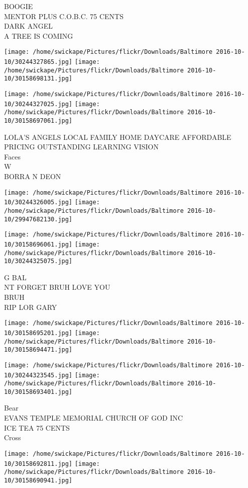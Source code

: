 \documentclass[10pt,letterpaper]{article}
\begin{document}
BOOGIE\\
MENTOR PLUS C.O.B.C. 75 CENTS\\
DARK ANGEL\\
A TREE IS COMING
\pagebreak

\texttt{[image: /home/swickape/Pictures/flickr/Downloads/Baltimore 2016-10-10/30244327865.jpg]}
\texttt{[image: /home/swickape/Pictures/flickr/Downloads/Baltimore 2016-10-10/30158698131.jpg]}

\texttt{[image: /home/swickape/Pictures/flickr/Downloads/Baltimore 2016-10-10/30244327025.jpg]}
\texttt{[image: /home/swickape/Pictures/flickr/Downloads/Baltimore 2016-10-10/30158697061.jpg]}

LOLA'S ANGELS LOCAL FAMILY HOME DAYCARE AFFORDABLE PRICING OUTSTANDING LEARNING VISION\\
Faces\\
W\\
BORRA N DEON
\pagebreak

\texttt{[image: /home/swickape/Pictures/flickr/Downloads/Baltimore 2016-10-10/30244326005.jpg]}
\texttt{[image: /home/swickape/Pictures/flickr/Downloads/Baltimore 2016-10-10/29947682130.jpg]}

\texttt{[image: /home/swickape/Pictures/flickr/Downloads/Baltimore 2016-10-10/30158696061.jpg]}
\texttt{[image: /home/swickape/Pictures/flickr/Downloads/Baltimore 2016-10-10/30244325075.jpg]}

G BAL\\
NT FORGET BRUH LOVE YOU\\
BRUH\\
RIP LOR GARY
\pagebreak

\texttt{[image: /home/swickape/Pictures/flickr/Downloads/Baltimore 2016-10-10/30158695201.jpg]}
\texttt{[image: /home/swickape/Pictures/flickr/Downloads/Baltimore 2016-10-10/30158694471.jpg]}

\texttt{[image: /home/swickape/Pictures/flickr/Downloads/Baltimore 2016-10-10/30244323545.jpg]}
\texttt{[image: /home/swickape/Pictures/flickr/Downloads/Baltimore 2016-10-10/30158693401.jpg]}

Bear\\
EVANS TEMPLE MEMORIAL CHURCH OF GOD INC\\
ICE TEA 75 CENTS\\
Cross
\pagebreak

\texttt{[image: /home/swickape/Pictures/flickr/Downloads/Baltimore 2016-10-10/30158692811.jpg]}
\texttt{[image: /home/swickape/Pictures/flickr/Downloads/Baltimore 2016-10-10/30158690941.jpg]}
\end{document}
